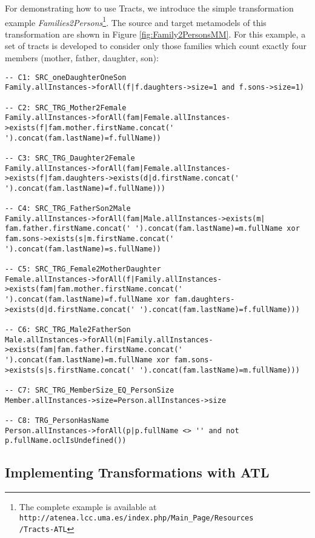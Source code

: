 For demonstrating how to use Tracts, we introduce the simple transformation example \emph{Families2Persons}\footnote{The complete example is available at \texttt{http://atenea.lcc.uma.es/index.php/Main\_Page/Resources\\/Tracts-ATL}}. The source and target metamodels of this transformation are shown in Figure \ref{fig:Family2PersonsMM}. For this example, a set of tracts is developed to consider only those families which count exactly four members (mother, father, daughter, son):

\begin{lstlisting}[numbers=none]
-- C1: SRC_oneDaughterOneSon
Family.allInstances->forAll(f|f.daughters->size=1 and f.sons->size=1)
		
-- C2: SRC_TRG_Mother2Female
Family.allInstances->forAll(fam|Female.allInstances->exists(f|fam.mother.firstName.concat(' ').concat(fam.lastName)=f.fullName))
		
-- C3: SRC_TRG_Daughter2Female
Family.allInstances->forAll(fam|Female.allInstances->exists(f|fam.daughters->exists(d|d.firstName.concat(' ').concat(fam.lastName)=f.fullName)))
		
-- C4: SRC_TRG_FatherSon2Male
Family.allInstances->forAll(fam|Male.allInstances->exists(m| fam.father.firstName.concat(' ').concat(fam.lastName)=m.fullName xor fam.sons->exists(s|m.firstName.concat(' ').concat(fam.lastName)=s.fullName))
		
-- C5: SRC_TRG_Female2MotherDaughter
Female.allInstances->forAll(f|Family.allInstances->exists(fam|fam.mother.firstName.concat(' ').concat(fam.lastName)=f.fullName xor fam.daughters->exists(d|d.firstName.concat(' ').concat(fam.lastName)=f.fullName)))
		
-- C6: SRC_TRG_Male2FatherSon
Male.allInstances->forAll(m|Family.allInstances->exists(fam|fam.father.firstName.concat(' ').concat(fam.lastName)=m.fullName xor fam.sons->exists(s|s.firstName.concat(' ').concat(fam.lastName)=m.fullName)))
		
-- C7: SRC_TRG_MemberSize_EQ_PersonSize
Member.allInstances->size=Person.allInstances->size

-- C8: TRG_PersonHasName
Person.allInstances->forAll(p|p.fullName <> '' and not p.fullName.oclIsUndefined())
\end{lstlisting}

\subsection{Implementing Transformations with ATL}

